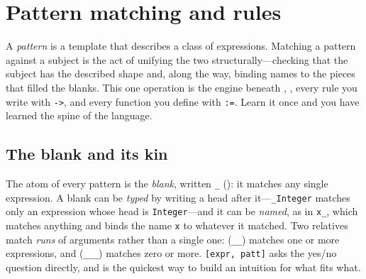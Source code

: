 \section{Pattern matching and rules}
\label{sec:prog-patterns}

A \emph{pattern} is a template that describes a class of
expressions. Matching a pattern against a subject is the act of unifying the two
structurally---checking that the subject has the described shape and, along the
way, binding names to the pieces that filled the blanks. This one operation is
the engine beneath , , every rule you write with
\texttt{->}, and every function you define with \texttt{:=}. Learn it once and
you have learned the spine of the language.

\subsection{The blank and its kin}
\label{ssec:prog-blank}

The atom of every pattern is the \emph{blank}, written \texttt{\_}
(): it matches any single
expression. A blank can be \emph{typed} by writing a head after it---\texttt{\_Integer}
matches only an expression whose head is \texttt{Integer}---and it can be
\emph{named}, as in \texttt{x\_}, which matches anything and binds the name
\texttt{x} to whatever it matched. Two relatives match \emph{runs} of arguments
rather than a single one:  (\texttt{\_\_}) matches one or more
expressions, and  (\texttt{\_\_\_}) matches zero or more.
\texttt{[expr, patt]} asks the yes/no question directly, and is the
quickest way to build an intuition for what fits what.

\begin{codepairs}
\end{codepairs}

